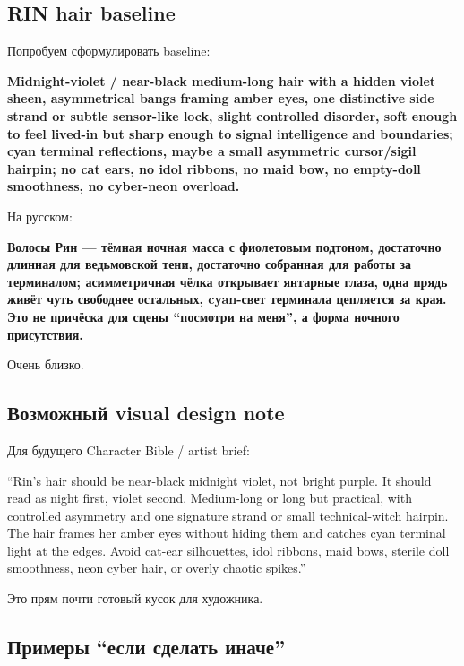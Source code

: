 \subsection*{RIN hair baseline}

Попробуем сформулировать baseline:

\textbf{Midnight-violet /\hspace{0pt} near-black medium-long hair with a hidden
violet sheen, asymmetrical bangs framing amber eyes, one distinctive
side strand or subtle sensor-like lock, slight controlled disorder, soft
enough to feel lived-in but sharp enough to signal intelligence and
boundaries; cyan terminal reflections, maybe a small asymmetric
cursor/\hspace{0pt}sigil hairpin; no cat ears, no idol ribbons, no maid bow, no
empty-doll smoothness, no cyber-neon overload.}

На русском:

\textbf{Волосы Рин --- тёмная ночная масса с фиолетовым подтоном,
достаточно длинная для ведьмовской тени, достаточно собранная для работы
за терминалом; асимметричная чёлка открывает янтарные глаза, одна прядь
живёт чуть свободнее остальных, cyan-свет терминала цепляется за края.
Это не причёска для сцены ``посмотри на меня'', а форма ночного
присутствия.}

Очень близко.

\subsection*{Возможный visual design note}

Для будущего Character Bible /\hspace{0pt} artist brief:

``Rin's hair should be near-black midnight violet, not bright purple. It
should read as night first, violet second. Medium-long or long but
practical, with controlled asymmetry and one signature strand or small
technical-witch hairpin. The hair frames her amber eyes without hiding
them and catches cyan terminal light at the edges. Avoid cat-ear
silhouettes, idol ribbons, maid bows, sterile doll smoothness, neon
cyber hair, or overly chaotic spikes.''

Это прям почти готовый кусок для художника.

\subsection*{Примеры ``если сделать иначе''}

